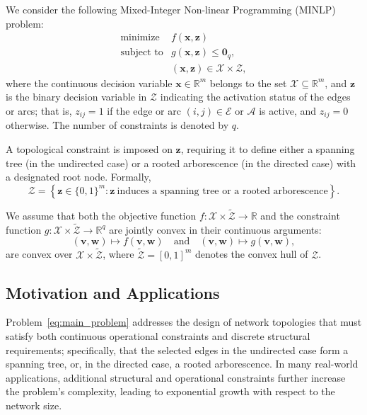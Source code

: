 \documentclass[11pt,a4paper]{article}
\theoremstyle{plain}
\theoremstyle{definition}
\theoremstyle{remark}
\begin{document}
	We consider the following Mixed-Integer Non-linear Programming (MINLP) problem:
	\begin{equation}
		\begin{array}{ll}
			\text{minimize} & f\left( \boldsymbol{x}, \boldsymbol{z} \right) \\[0.3em]
			\text{subject to} & g\left( \boldsymbol{x}, \boldsymbol{z} \right) \leq \boldsymbol{0}_q, \\[0.2em]
			& \left( \boldsymbol{x}, \boldsymbol{z} \right) \in \mathcal{X} \times \mathcal{Z},
		\end{array}
		\label{eq:main_problem}
	\end{equation}
	where the continuous decision variable $\boldsymbol{x} \in \mathbb{R}^m$ belongs to the set $\mathcal{X} \subseteq \mathbb{R}^m$, and $\boldsymbol{z}$ is the binary decision variable in $\mathcal{Z}$ indicating the activation status of the edges or arcs; that is, $z_{ij} = 1$ if the edge or arc $(i,j) \in \mathcal{E}$ or $\mathcal{A}$ is active, and $z_{ij} = 0$ otherwise. The number of constraints is denoted by $q$.
	
	A topological constraint is imposed on $\boldsymbol{z}$, requiring it to define either a spanning tree (in the undirected case) or a rooted arborescence (in the directed case) with a designated root node. Formally,
	\[
	\mathcal{Z} = \left\{ \boldsymbol{z} \in \{0,1\}^m : \boldsymbol{z} \ \text{induces a spanning tree or a rooted arborescence} \right\}.
	\]
	
	
	We assume that both the objective function $f : \mathcal{X} \times \tilde{\mathcal{Z}} \to \mathbb{R}$ and the constraint function $g : \mathcal{X} \times \tilde{\mathcal{Z}} \to \mathbb{R}^q$ are jointly convex in their continuous arguments:
	\[
	(\boldsymbol{v}, \boldsymbol{w}) \mapsto f(\boldsymbol{v}, \boldsymbol{w})
	\quad \text{and} \quad
	(\boldsymbol{v}, \boldsymbol{w}) \mapsto g(\boldsymbol{v}, \boldsymbol{w}),
	\]
	are convex over $\mathcal{X} \times \tilde{\mathcal{Z}}$, where $\tilde{\mathcal{Z}}=[0,1]^m$ denotes the convex hull of $\mathcal{Z}$.
	
	\subsection{Motivation and Applications}
	Problem~\eqref{eq:main_problem} addresses the design of network topologies that must satisfy both continuous operational constraints and discrete structural requirements; specifically, that the selected edges in the undirected case form a spanning tree, or, in the directed case, a rooted arborescence. In many real-world applications, additional structural and operational constraints further increase the problem's complexity, leading to exponential growth with respect to the network size.
	
\end{document}
